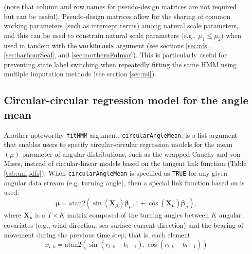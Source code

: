 \documentclass[12pt]{article}\usepackage[]{graphicx}\usepackage[]{color}
\begin{document}
\noindent (note that column and row names for pseudo-design matrices are not required but can be useful). Pseudo-design matrices allow for the sharing of common working parameters (such as intercept terms) among natural scale parameters, and this can be used to constrain natural scale parameters (e.g., $\mu_1 \le \mu_2$) when used in tandem with the \verb|workBounds| argument (see sections \ref{sec:nfs}, \ref{sec:harbourSeal}, and \ref{sec:northernFulmar}).  This is particularly useful for preventing state label switching when repeatedly fitting the same HMM using multiple imputation methods (see section \ref{sec:mi}).

\subsection{Circular-circular regression model for the angle mean}
\label{sec:circ}
Another noteworthy \verb|fitHMM| argument, \verb|circularAngleMean|, is a list argument that enables users to specify circular-circular regression models for the mean $(\mu)$ parameter of angular distributions, such as the wrapped Cauchy and von Mises, instead of circular-linear models based on the tangent link function (Table \ref{tab:unipdfs}). When \verb|circularAngleMean| is specified as \verb|TRUE| for any given angular data stream (e.g. turning angle), then a special link function based on \cite{RivestEtAl2016} is used:
\begin{equation}
  {\boldsymbol \mu}=\text{atan2}(\sin({\mathbf X}_\mu){\boldsymbol \beta}_\mu,1+\cos({\mathbf X}_\mu){\boldsymbol \beta}_\mu),
  \label{eq:circ}
\end{equation}
where ${\mathbf X}_\mu$ is a $T \times K$ matrix composed of the turning angles between $K$ angular covariates (e.g., wind direction, sea surface current direction) and the bearing of movement during the previous time step; that is, each element 
\begin{equation}
x_{t,k}=\text{atan2}(\sin(r_{t,k}-b_{t-1}),\cos(r_{t,k}-b_{t-1})) 
  \label{eq:angleCov}
\end{equation}
\end{document}

